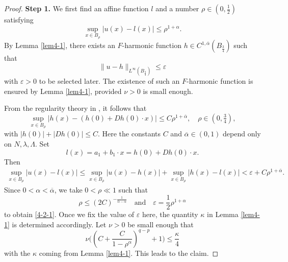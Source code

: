 \documentclass[11pt,reqno]{amsart}
\numberwithin{equation}{section}
\begin{document}
\begin{proof}
\textbf{Step 1.} We first find an affine function $l$ and a number $\rho\in\left(0,\frac{1}{2}\right)$ satisfying
\begin{equation}
\label{4-2-1}
 \sup_{x\in B_\rho}|u(x)-l(x)|\le\rho^{1+\alpha}.
\end{equation}
By Lemma \ref{lem4-1}, there exists an $F$-harmonic function $h\in C^{1,\overline{\alpha}}(B_{\frac34})$ such that
$$
\|u-h\|_{L^\infty(B_{\frac34})}\le\varepsilon
$$
with $\varepsilon>0$ to be selected later. The existence of such an $F$-harmonic function is ensured by Lemma \ref{lem4-1}, provided $\nu>0$ is small enough.

From the regularity theory in \cite{CC95}, it follows that
$$
\sup_{x\in B_\rho}|h(x)-(h(0)+Dh(0)\cdot x)|\leq C\rho^{1+\overline{\alpha}},
\quad \rho\in\left(0,\tfrac34\right),
$$
with $|h(0)|+|Dh(0)|\leq C$.
Here the constants $C$ and $\overline{\alpha}\in(0,1)$ depend only on $N,\lambda,\Lambda$. Set
$$
l(x)=a_1+b_1\cdot x=h(0)+Dh(0)\cdot x.
$$
Then
\begin{align*}
\sup_{x\in B_\rho}|u(x)-l(x)|\leq \sup_{x\in B_\rho}|u(x)-h(x)|+\sup_{x\in B_\rho}|h(x)-l(x)|<\varepsilon+C\rho^{1+\overline{\alpha}}.
\end{align*}
Since $0<\alpha<\overline{\alpha}$, we take $0<\rho\ll1$ such that
$$
\rho\leq(2C)^{-\frac{1}{\overline{\alpha}-\alpha}} \quad\text{and}\quad  \varepsilon=\frac{1}{2}\rho^{1+\alpha}
$$
to obtain \eqref{4-2-1}. Once we fix the value of $\varepsilon$ here, the quantity $\kappa$ in  Lemma \ref{lem4-1} is determined accordingly.
Let  $\nu>0$ be small enough that
\begin{equation*}
\nu\biggl(\left(C+\frac{C}{1-\rho^\alpha}\right)^{q-p}+1\biggr)\le \frac{\kappa}{4}
\end{equation*}
with the $\kappa$ coming from Lemma \ref{lem4-1}. %
This leads to the claim.

\medskip


\end{proof}
\end{document}
